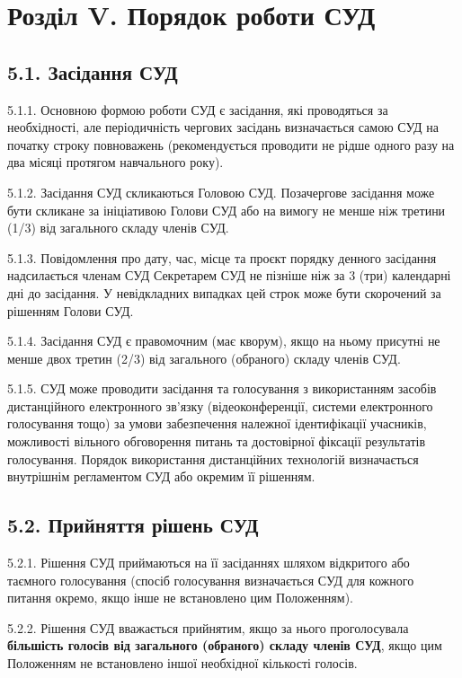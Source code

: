 \section*{Розділ V. Порядок роботи СУД}

\subsection*{5.1. Засідання СУД}
    5.1.1. Основною формою роботи СУД є засідання, які проводяться за необхідності, але періодичність чергових засідань визначається самою СУД на початку строку повноважень (рекомендується проводити не рідше одного разу на два місяці протягом навчального року).

    5.1.2. Засідання СУД скликаються Головою СУД. Позачергове засідання може бути скликане за ініціативою Голови СУД або на вимогу не менше ніж третини (1/3) від загального складу членів СУД.

    5.1.3. Повідомлення про дату, час, місце та проєкт порядку денного засідання надсилається членам СУД Секретарем СУД не пізніше ніж за 3 (три) календарні дні до засідання. У невідкладних випадках цей строк може бути скорочений за рішенням Голови СУД.

    5.1.4. Засідання СУД є правомочним (має кворум), якщо на ньому присутні не менше двох третин (2/3) від загального (обраного) складу членів СУД.

    5.1.5. СУД може проводити засідання та голосування з використанням засобів дистанційного електронного зв'язку (відеоконференції, системи електронного голосування тощо) за умови забезпечення належної ідентифікації учасників, можливості вільного обговорення питань та достовірної фіксації результатів голосування. Порядок використання дистанційних технологій визначається внутрішнім регламентом СУД або окремим її рішенням.

\subsection*{5.2. Прийняття рішень СУД}
    5.2.1. Рішення СУД приймаються на її засіданнях шляхом відкритого або таємного голосування (спосіб голосування визначається СУД для кожного питання окремо, якщо інше не встановлено цим Положенням).

    5.2.2. Рішення СУД вважається прийнятим, якщо за нього проголосувала \textbf{більшість голосів від загального (обраного) складу членів СУД}, якщо цим Положенням не встановлено іншої необхідної кількості голосів.

